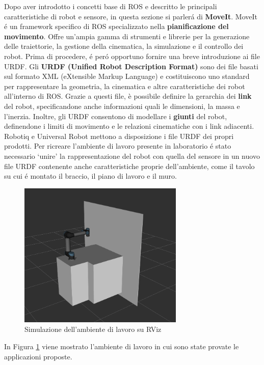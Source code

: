 Dopo aver introdotto i concetti base di ROS e descritto le principali caratteristiche di robot e sensore, in questa sezione si 
parler\'{a} di \textbf{MoveIt}. 
MoveIt \'{e} un framework specifico di ROS specializzato nella \textbf{pianificazione del movimento}. Offre un'ampia gamma 
di strumenti e librerie per la generazione delle traiettorie, la gestione della cinematica, la simulazione e il controllo 
dei robot. 
Prima di procedere, \'{e} per\'{o} opportuno fornire una breve introduzione ai file URDF.
Gli \textbf{URDF (Unified Robot Description Format)} sono dei file basati sul formato XML (eXtensible Markup Language) e 
costituiscono uno standard per rappresentare la geometria, la cinematica e altre caratteristiche dei robot all'interno di ROS. 
Grazie a questi file, è possibile definire la gerarchia dei \textbf{link} del robot, specificandone anche informazioni quali  
le dimensioni, la massa e l'inerzia. Inoltre, gli URDF consentono di modellare i \textbf{giunti}
del robot, definendone i limiti di movimento e le relazioni cinematiche con i link adiacenti. 
Robotiq e Universal Robot mettono a disposizione i file URDF dei propri prodotti. Per ricreare l'ambiente di lavoro presente in 
laboratorio \'{e} stato necessario `unire' la rappresentazione del robot con quella del sensore in un nuovo file URDF contenente 
anche caratteristiche proprie dell'ambiente, come il tavolo su cui \'{e} montato il braccio, il piano di lavoro e il muro. 
\begin{figure}[H]
    \centering
    \includegraphics*[width=0.70\textwidth]{images/workcell.png}
    \caption{Simulazione dell'ambiente di lavoro su RViz}
    \label{fig:workcell}
\end{figure}
In Figura \ref{fig:workcell} viene mostrato l'ambiente di lavoro in cui sono state provate le applicazioni proposte. 
